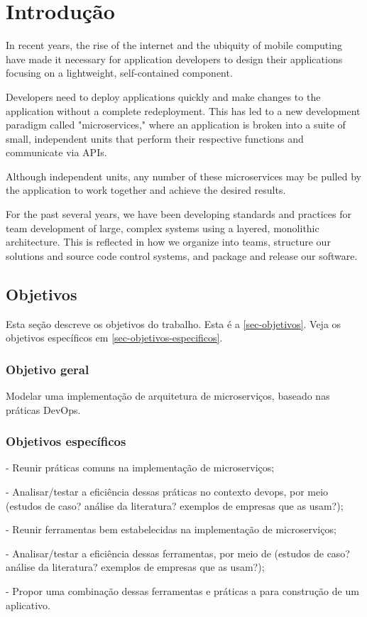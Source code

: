 \chapter{Introdução}

In recent years, the rise of the internet and the ubiquity of mobile computing have made it necessary for application developers to design their applications focusing on a lightweight, self-contained component.

Developers need to deploy applications quickly and make changes to the application without a complete redeployment. This has led to a new development paradigm called "microservices," where an application is broken into a suite of small, independent units that perform their respective functions and communicate via APIs.

Although independent units, any number of these microservices may be pulled by the application to work together and achieve the desired results.

For the past several years, we have been developing standards and practices for team development of large, complex systems using a layered, monolithic architecture. This is reflected in how we organize into teams, structure our solutions and source code control systems, and package and release our software. 


\section{Objetivos}\label{sec-objetivos}

Esta seção descreve os objetivos do trabalho. Esta é a
\autoref{sec-objetivos}. Veja os objetivos específicos em \autoref{sec-objetivos-especificos}.

\subsection{Objetivo geral}\label{sec-objetivo-geral}

Modelar uma implementação de arquitetura de microserviços, baseado nas práticas DevOps.

\subsection{Objetivos específicos}\label{sec-objetivos-especificos}

- Reunir práticas comuns na implementação de microserviços;

- Analisar/testar a eficiência dessas práticas no contexto devops, por meio (estudos de caso? análise da literatura? exemplos de empresas que as usam?);

- Reunir ferramentas bem estabelecidas na implementação de microserviços;

- Analisar/testar a eficiência dessas ferramentas, por meio de (estudos de caso? análise da literatura? exemplos de empresas que as usam?);

- Propor uma combinação dessas ferramentas e práticas a para construção de um aplicativo.